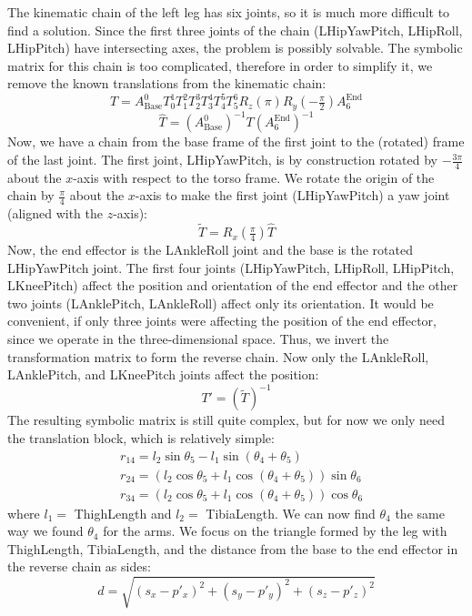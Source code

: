 The kinematic chain of the left leg has six joints, so it is much more difficult to find a solution. Since the first three joints of the chain (LHipYawPitch,  LHipRoll, LHipPitch) have intersecting axes, the problem is possibly solvable. The symbolic matrix for this chain is too complicated, therefore in order to simplify it, we remove the known translations from the kinematic chain:
\[
T = A^0_\text{Base}T^1_0T^2_1T^3_2T^4_3T^5_4T^6_5R_z(\pi)R_y(-\tfrac{\pi}{2})A^\text{End}_6
\]
\[
\widehat{T} = {\left(A^0_\text{Base}\right)}^{-1}T{\left(A^\text{End}_6\right)}^{-1}
\]
Now, we have a chain from the base frame of the first joint to the (rotated) frame of the last joint. The first joint, LHipYawPitch, is by construction rotated by $-\frac{3\pi}{4} $ about the $ x $-axis with respect to the torso frame. We rotate the origin of the chain by $\frac{\pi}{4}$ about the $x$-axis to make the first joint (LHipYawPitch) a yaw joint (aligned with the $z$-axis):
\[
\widetilde{T} = R_x(\tfrac{\pi}{4})\widehat{T}
\]
Now, the end effector is the LAnkleRoll joint and the base is the rotated LHipYawPitch joint. The first four joints (LHipYawPitch, LHipRoll, LHipPitch, LKneePitch) affect the position and orientation of the end effector and the other two joints (LAnklePitch, LAnkleRoll) affect only its orientation. It would be convenient, if only three joints were affecting the position of the end effector, since we operate in the three-dimensional space. Thus, we invert the transformation matrix to form the reverse chain. Now only the LAnkleRoll, LAnklePitch, and LKneePitch joints affect the position:
\[
T' = {\left(\widetilde{T}\right)}^{-1}
\]
The resulting symbolic matrix is still quite complex, but for now we only need the translation block, which is relatively simple:
\begin{align*}
&r_{14} = l_2\sin\theta_5 - l_1\sin\left(\theta_4 + \theta_5\right)\\
&r_{24} = \left(l_2\cos\theta_5 + l_1 \cos\left(\theta_4 + \theta_5\right)\right)\sin\theta_6\\
&r_{34} = \left(l_2\cos\theta_5 + l_1 \cos\left(\theta_4 + \theta_5\right)\right)\cos\theta_6
\end{align*}
where $l_1 =$ ThighLength and $l_2 =$ TibiaLength.
We can now find $\theta_4$ the same way we found $\theta_4$ for the arms. We focus on the triangle formed by the leg with  ThighLength, TibiaLength, and the distance from the base to the end effector in the reverse chain as sides:
\[
d = \sqrt{\left(s_x-p'_x\right)^2 + \left(s_y-p'_y\right)^2 + \left(s_z-p'_z\right)^2}
\]
